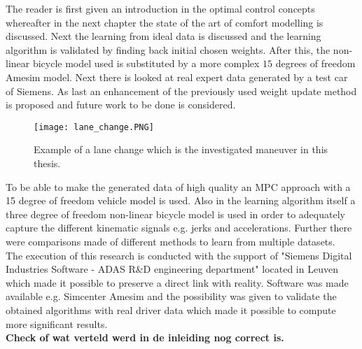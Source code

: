 The reader is first given an introduction in the optimal control concepts whereafter in the next chapter the state of the art of comfort modelling is discussed. Next the learning from ideal data is discussed and the learning algorithm is validated by finding back initial chosen weights. After this, the non-linear bicycle model used is substituted by a more complex $15$ degrees of freedom Amesim model. Next there is looked at real expert data generated by a test car of Siemens. As last an enhancement of the previously used weight update method is proposed and future work to be done is considered.
\begin{figure}[htp]
	\centering
	\texttt{[image: lane\_change.PNG]}
	\caption{Example of a lane change which is the investigated maneuver in this thesis.}
	\label{fig:lane_change}
\end{figure}

To be able to make the generated data of high quality an MPC approach with a 15 degree of freedom vehicle model is used. Also in the learning algorithm itself a three degree of freedom non-linear bicycle model is used in order to adequately capture the different kinematic signals e.g. jerks and accelerations. Further there were comparisons made of different methods to learn from multiple datasets. \\

The execution of this research is conducted with the support of "Siemens Digital Industries Software - ADAS R\&D engineering department" located in Leuven which made it possible to preserve a direct link with reality. Software was made available e.g. Simcenter Amesim and the possibility was given to validate the obtained algorithms with real driver data which made it possible to compute more significant results.\\

\textbf{Check of wat verteld werd in de inleiding nog correct is.}

